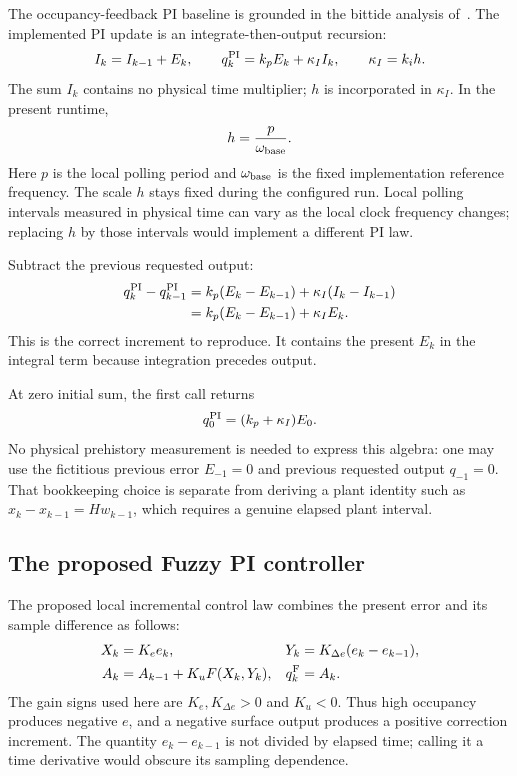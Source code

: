 The occupancy-feedback PI baseline is grounded in the bittide analysis
of~\cite{lall2022resistance}. The implemented PI update is an
integrate-then-output recursion:
\begin{equation}
 I_k=I_{k-1}+E_k,\qquad
 q_k^{\rm PI}=k_pE_k+\kappa_I I_k,\qquad \kappa_I=k_i h.
 \label{detail:eq:fpi_native}
\end{equation}
The sum $I_k$ contains no physical time multiplier; $h$ is incorporated in
$\kappa_I$. In the present runtime,
\begin{equation}
 h=\frac{p}{\omega_{\rm base}}.
 \label{detail:eq:fpd_h}
\end{equation}
Here $p$ is the local polling period and $\omega_{\rm base}$ is the fixed implementation reference frequency. The scale $h$ stays fixed during the configured run. Local polling intervals measured
in physical time can vary as the local clock frequency changes; replacing $h$ by
those intervals would implement a different PI law.

Subtract the previous requested output:
\begin{align}
 q_k^{\rm PI}-q_{k-1}^{\rm PI}
 &=k_p(E_k-E_{k-1})+\kappa_I(I_k-I_{k-1})\\
 &=k_p(E_k-E_{k-1})+\kappa_I E_k.
 \label{detail:eq:fpi_pi_increment}
\end{align}
This is the correct increment to reproduce. It contains the present
$E_k$ in the integral term because integration precedes output.

At zero initial sum, the first call returns
\begin{equation}
 q_0^{\rm PI}=(k_p+\kappa_I)E_0.
 \label{detail:eq:fpd_first}
\end{equation}
No physical prehistory measurement is needed to express this algebra:
one may use the fictitious previous error $E_{-1}=0$ and previous requested
output $q_{-1}=0$. That bookkeeping choice is separate from deriving a
plant identity such as $x_k-x_{k-1}=H w_{k-1}$, which requires a genuine
elapsed plant interval.

\subsection{The proposed Fuzzy PI controller}

The proposed local incremental control law combines the present error
and its sample difference as follows:
\begin{align}
 X_k&=K_e e_k,&Y_k&=K_{\Delta e}(e_k-e_{k-1}),\\
 A_k&=A_{k-1}+K_uF(X_k,Y_k),&q_k^{\rm F}&=A_k.
 \label{detail:eq:fpi_fuzzy_law}
\end{align}
The gain signs used here are $K_e,K_{\Delta e}>0$ and $K_u<0$. Thus high occupancy
produces negative $e$, and a negative surface output produces a positive
correction increment. The quantity $e_k-e_{k-1}$ is not divided by elapsed
time; calling it a time derivative would obscure its sampling dependence.

